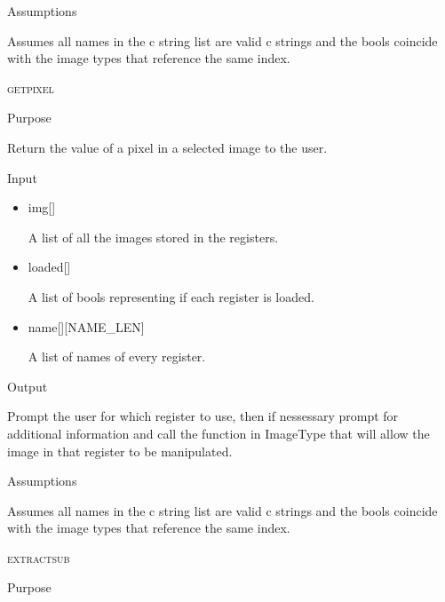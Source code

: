 \documentclass[pdftex, 11pt]{article}
\begin{document}
\begin{description}
\begin{description}
			\item{Assumptions}

				Assumes all names in the c string list are valid c
				strings and the bools coincide with the image types that
				reference the same index.

		\end{description}



	\item{\textsc{getpixel}}
		\begin{description}
			\item{Purpose}

				Return the value of a pixel in a selected image to the user.

			\item{Input}

				\begin{itemize}

					\item{img[]}

						A list of all the images stored in the registers.

					\item{loaded[]}

						A list of bools representing if each register is loaded.

					\item{name[][NAME\_LEN]}

						A list of names of every register.

				\end{itemize}

			\item{Output}

				Prompt the user for which register to use, then if nessessary
				prompt for additional information and call the function
				in ImageType that will allow the image in that register to
				be manipulated.

			\item{Assumptions}

				Assumes all names in the c string list are valid c
				strings and the bools coincide with the image types that
				reference the same index.

		\end{description}



	\item{\textsc{extractsub}}
		\begin{description}
			\item{Purpose}


\end{description}
\end{description}
\end{document}
